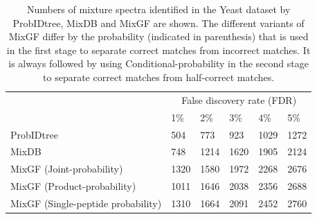 \documentclass[runningheads,a4paper]{llncs}
\begin{document}
\begin{table}
	\begin{center}
	  \begin{tabular}{p{5cm}|p{1.2cm}p{1.2cm}p{1.2cm}p{1.2cm}p{1.2cm}} %
			\hline
              & \multicolumn{5}{c}{False discovery rate (FDR)} \\
			      & 1\%  & 2\% & 3\% & 4\% & 5\%  \\
  			\hline
  			\noalign{\smallskip}
  			ProbIDtree & 504  & 773  & 923 & 1029  & 1272 \\
  			MixDB      & 748 & 1214 & 1620 & 1905 & 2124  \\
  			MixGF (Joint-probability) & 1320 & 1580 & 1972 & 2268 & 2676 \\
  			MixGF (Product-probability) & 1011 & 1646 & 2038 & 2356 & 2688 \\
			  MixGF (Single-peptide probability) & 1310 & 1664 & 2091 & 2452 & 2760\\
			 \hline
		\end{tabular}
  \end{center}
	\caption{Numbers of mixture spectra identified in the Yeast dataset by ProbIDtree, MixDB and MixGF are shown.  The different variants of MixGF differ by the probability (indicated in parenthesis) that is used in the first stage to separate correct matches from incorrect matches.  It is always followed by using Conditional-probability in the second stage to separate correct matches from half-correct matches.}
	\label{tab:compare}
\end{table}
\vspace{-5mm}
\end{document}
